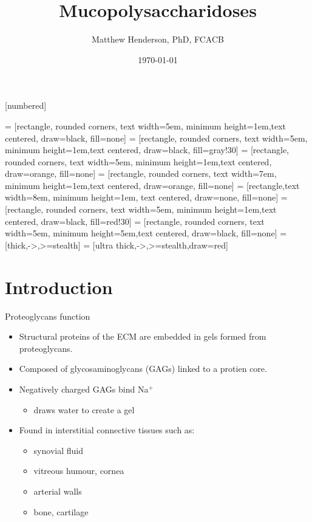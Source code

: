 \documentclass[presentation, smaller]{beamer}
\author{Matthew Henderson, PhD, FCACB}
\date{\today}
\title{Mucopolysaccharidoses}
\institute[NSO]{Newborn Screening Ontario | The University of Ottawa}
\begin{document}
\maketitle

\begin{LaTeX}


\vspace{220pt}
\beamertemplatenavigationsymbolsempty
{}[numbered]

 = [rectangle, rounded corners, text width=5em, minimum height=1em,text centered, draw=black, fill=none]
 = [rectangle, rounded corners, text width=5em, minimum height=1em,text centered, draw=black, fill=gray!30]
 = [rectangle, rounded corners, text width=5em, minimum height=1em,text centered, draw=orange, fill=none]
 = [rectangle, rounded corners, text width=7em, minimum height=1em,text centered, draw=orange, fill=none]
 = [rectangle,text width=8em, minimum height=1em, text centered, draw=none, fill=none]
 = [rectangle, rounded corners, text width=5em, minimum height=1em,text centered, draw=black, fill=red!30]
 = [rectangle, rounded corners, text width=5em, minimum height=5em,text centered, draw=black, fill=none]
 = [thick,->,>=stealth]
 = [ultra thick,->,>=stealth,draw=red]
\end{LaTeX}


\section{Introduction}
\label{sec:org9c666fb}
\begin{frame}[label={sec:orgb7a4dbe}]{Proteoglycans function}
\begin{itemize}
\item Structural proteins of the ECM are embedded in gels formed from
proteoglycans.
\item Composed of glycosaminoglycans (GAGs) linked to a protien core.
\item Negatively charged GAGs bind Na\(^{\text{+}}\)
\begin{itemize}
\item draws water to create a gel
\end{itemize}
\item Found in interstitial connective tissues such as: 
\begin{itemize}
\item synovial fluid
\item vitreous humour, cornea
\item arterial walls
\item bone, cartilage
\end{itemize}
\end{itemize}
\end{frame}
\end{document}
